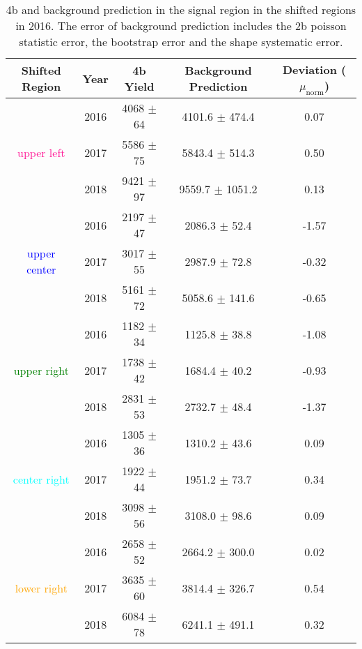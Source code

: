 \begin{table}[ht]
    \centering
    \begin{tabular}{ccccc}
        \toprule
            Shifted Region & Year & 4b Yield & Background Prediction & Deviation ($\mu_\mathrm{norm}$)\\
        \midrule
            {}                                       & 2016 & 4068 $\pm$ 64 & 4101.6 $\pm$ 474.4 &  0.07 \\
\textcolor{deeppink}{upper left}    & 2017 & 5586 $\pm$ 75 & 5843.4 $\pm$ 514.3 &  0.50 \\
	    {}                                       & 2018 & 9421 $\pm$ 97 & 9559.7 $\pm$ 1051.2 &  0.13 \\
            \hline
            {}                                         & 2016 & 2197 $\pm$ 47 & 2086.3 $\pm$  52.4 & -1.57 \\
\textcolor{blue}{upper center}  & 2017 & 3017 $\pm$ 55 & 2987.9 $\pm$  72.8 & -0.32 \\
            {}                                         & 2018 & 5161 $\pm$ 72 & 5058.6 $\pm$  141.6 & -0.65 \\
	    \hline
            {}                                        & 2016 & 1182 $\pm$ 34 & 1125.8 $\pm$  38.8 & -1.08 \\
\textcolor{green}{upper right} & 2017 & 1738 $\pm$ 42 & 1684.4 $\pm$  40.2 & -0.93 \\
            {}                                        & 2018 & 2831 $\pm$ 53 & 2732.7 $\pm$   48.4 & -1.37 \\
	    \hline
	    {}                               & 2016 & 1305 $\pm$ 36 & 1310.2 $\pm$  43.6 &  0.09 \\
\textcolor{cyan}{center right} & 2017 & 1922 $\pm$ 44 & 1951.2 $\pm$  73.7 &  0.34 \\
            {}                                & 2018 & 3098 $\pm$ 56 & 3108.0 $\pm$   98.6 &  0.09 \\
	    \hline
            {}                                  & 2016 & 2658 $\pm$ 52 & 2664.2 $\pm$ 300.0 &  0.02 \\
\textcolor{orange}{lower right} & 2017 & 3635 $\pm$ 60 & 3814.4 $\pm$ 326.7 &  0.54 \\
 	    {}                                  & 2018 & 6084 $\pm$ 78 & 6241.1 $\pm$  491.1 &  0.32 \\
        \bottomrule
    \end{tabular}
    \caption{4b and background prediction in the signal region in the shifted regions in 2016. The error of background prediction includes the 2b poisson statistic error, the bootstrap error and the shape systematic error.}
    \label{tab:shifted-4b-yields}
\end{table}

